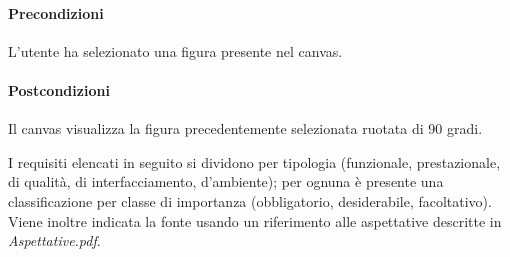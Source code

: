 \paragraph{Precondizioni} L'utente ha selezionato una figura presente nel canvas.
\paragraph{Postcondizioni} Il canvas visualizza la figura precedentemente selezionata ruotata di 90 gradi.

\label{listarequisiti}
I requisiti elencati in seguito si dividono per tipologia (funzionale, prestazionale, di qualit\`a, di interfacciamento, d'ambiente); 
per ognuna \`e presente una classificazione per classe di importanza (obbligatorio, desiderabile, facoltativo). Viene inoltre indicata la fonte usando un riferimento alle aspettative descritte in \textit{Aspettative.pdf}.
